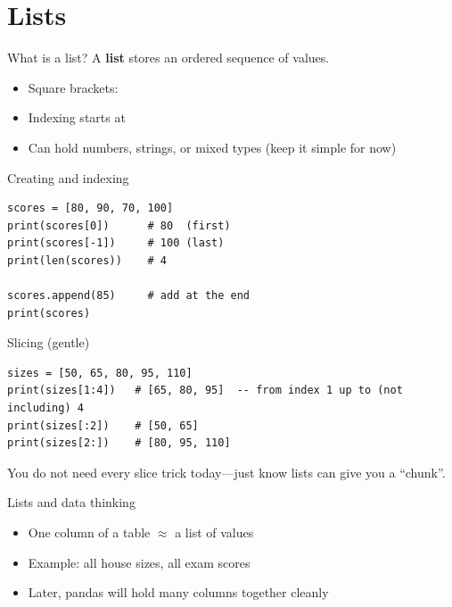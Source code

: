 \documentclass[aspectratio=169,11pt]{beamer}
\begin{document}
    \section{Lists}

    \begin{frame}{What is a list?}
        A \textbf{list} stores an ordered sequence of values.
        \vspace{0.5em}
        \begin{itemize}
            \item Square brackets: \pycode{[10, 20, 30]}
            \item Indexing starts at 
            \item Can hold numbers, strings, or mixed types (keep it simple for now)
        \end{itemize}
    \end{frame}

    \begin{frame}[fragile]{Creating and indexing}
        \begin{lstlisting}
scores = [80, 90, 70, 100]
print(scores[0])      # 80  (first)
print(scores[-1])     # 100 (last)
print(len(scores))    # 4

scores.append(85)     # add at the end
print(scores)
        \end{lstlisting}
    \end{frame}

    \begin{frame}[fragile]{Slicing (gentle)}
        \begin{lstlisting}
sizes = [50, 65, 80, 95, 110]
print(sizes[1:4])   # [65, 80, 95]  -- from index 1 up to (not including) 4
print(sizes[:2])    # [50, 65]
print(sizes[2:])    # [80, 95, 110]
        \end{lstlisting}
        \vspace{0.3em}
        You do not need every slice trick today---just know lists can give you a ``chunk''.
    \end{frame}

    \begin{frame}{Lists and data thinking}
        \begin{itemize}
            \item One column of a table $\approx$ a list of values
            \item Example: all house sizes, all exam scores
            \item Later, pandas will hold many columns together cleanly
        \end{itemize}
        \vspace{0.4em}
    \end{frame}
\end{document}
